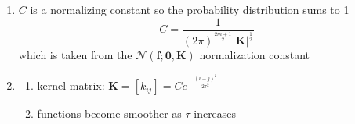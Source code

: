 \documentclass{article}
\begin{document}
\begin{enumerate}
        \item $C$ is a normalizing constant so the probability distribution sums to 1
            \[C = \frac{1}{(2\pi)^\frac{2m+1}{2}|\bm{K}|^\frac{1}{2}}\]
            which is taken from the $\boldsymbol{\mathcal{N}}(\bm{f}; \bm{0}, \bm{K})$ 
            normalization constant
        \item 
            \begin{enumerate}
                \item 
                    kernel matrix: $\bm{K} = [k_{ij}] = Ce^{-\frac{(i-j)^2}{2\tau^2}}$ \\
                    \vspace{0.5cm}
                    \vspace{0.5cm}
                \item functions become smoother as $\tau$ increases \\
                \vspace{0.5cm}
                \vspace{0.5cm}


\end{enumerate}
\end{enumerate}
\end{document}

